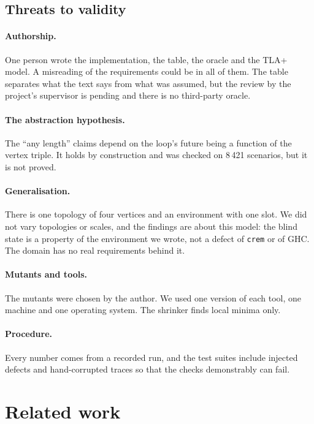 \documentclass[review]{jfp-epi}
\newcommand{\crem}{\texttt{crem}}
\begin{document}
\subsection{Threats to validity}
\label{sec:threats}

\paragraph{Authorship.} One person wrote the implementation, the table, the oracle and the TLA+ model. A misreading of the requirements could be in all of them. The table separates what the text says from what was assumed, but the review by the project's supervisor is pending and there is no third-party oracle.

\paragraph{The abstraction hypothesis.} The ``any length'' claims depend on the loop's future being a function of the vertex triple. It holds by construction and was checked on 8\,421 scenarios, but it is not proved.

\paragraph{Generalisation.} There is one topology of four vertices and an environment with one slot. We did not vary topologies or scales, and the findings are about this model: the blind state is a property of the environment we wrote, not a defect of \crem{} or of GHC. The domain has no real requirements behind it.

\paragraph{Mutants and tools.} The mutants were chosen by the author. We used one version of each tool, one machine and one operating system. The shrinker finds local minima only.

\paragraph{Procedure.} Every number comes from a recorded run, and the test suites include injected defects and hand-corrupted traces so that the checks demonstrably can fail.

\section{Related work}
\label{sec:related}
\end{document}
